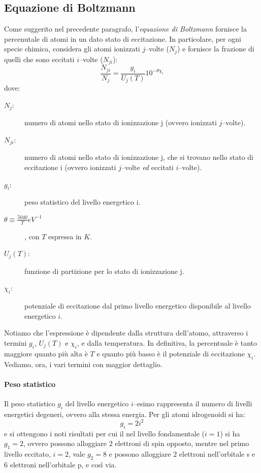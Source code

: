 \subsection{Equazione di Boltzmann}\label{sec:equazione-boltzmann}
Come suggerito nel precedente paragrafo, l'\emph{equazione di Boltzmann} fornisce la percenutale di atomi in un dato stato di eccitazione. In particolare, per ogni specie chimica, considera gli atomi ionizzati $j$--volte ($N_j$) e fornisce la frazione di quelli che sono eccitati $i$--volte ($N_{ji}$):
\begin{equation}\label{eq:equazione-boltzmann}
    \dfrac{N_{ji}}{N_j} = \dfrac{g_i}{{U_j}(T)} 10^{-\theta \chi_i} 
\end{equation}
dove:
\begin{description}
    \item[$N_j$:] numero di atomi nello stato di ionizzazione j (ovvero ionizzati $j$--volte).
    \item[$N_{ji}$:] numero di atomi nello stato di ionizzazione j, che si trovano nello stato di eccitazione i (ovvero ionizzati $j$--volte \emph{ed} eccitati $i$--volte).
    \item[$g_i$:] peso statistico del livello energetico i.
    \item[$\theta \equiv \frac{5040}{T} \si{eV^{-1}}$], con $T$ espressa in $\si{K}$.
    \item[${U_j}(T)$:] funzione di partizione per lo stato di ionizzazione j.
    \item[$\chi_i$:] potenziale di eccitazione dal primo livello energetico disponibile al livello energetico $i$.      
\end{description}
Notiamo che l'espressione è dipendente dalla struttura dell'atomo, attraverso i termini $g_i$, ${U_j}(T)$ e $\chi_i$, e dalla temperatura. In definitiva, la percentuale è tanto maggiore quanto più alta è $T$ e quanto più basso è il potenziale di eccitazione $\chi_i$. Vediamo, ora, i vari termini con maggior dettaglio.

\paragraph{Peso statistico}
Il peso statistico $g_i$ del livello energetico $i$--esimo rappresenta il numero di livelli energetici degeneri, ovvero alla stessa energia. Per gli atomi idrogenoidi si ha:
\begin{equation*}
g_i = 2 i^2
\end{equation*}
e si ottengono i noti risultati per cui il nel livello fondamentale ($i=1$) si ha $g_1 = 2$, ovvero possono alloggiare $2$ elettroni di spin opposto, mentre nel primo livello eccitato, $i=2$, vale $g_2=8$ e possono alloggiare $2$ elettroni nell'orbitale s e $6$ elettroni nell'orbitale p, e così via.

